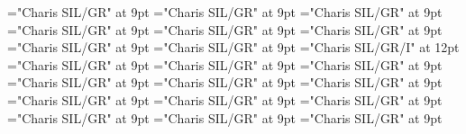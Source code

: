 \documentclass[gps1,twoside]{article}
\begin{document}
\font\complexformsnotsubentrycomplexformsnotsubentrycomplexformsnotsubentriesentrybefore="Charis SIL/GR" at 9pt
\font\complexformsnotsubentriesentryafter="Charis SIL/GR" at 9pt
\font\complexformtypescomplexformsnotsubentrycomplexformsnotsubentriesentryafter="Charis SIL/GR" at 9pt
\font\spanspanreverseabbrcomplexformtypecomplexformtypescomplexformsnotsubentrycomplexformsnotsubentriesentrybefore="Charis SIL/GR" at 9pt
\font\spanspanheadwordcomplexformsnotsubentrycomplexformsnotsubentriesentrybefore="Charis SIL/GR" at 9pt
\font\spanheadwordcomplexformsnotsubentrycomplexformsnotsubentriesentrylastchildafter="Charis SIL/GR" at 9pt
\font\morphosyntaxanalysismorphosyntaxanalysismorphosyntaxanalysescomplexformsnotsubentrycomplexformsnotsubentriesentrybefore="Charis SIL/GR" at 9pt
\font\morphosyntaxanalysescomplexformsnotsubentrycomplexformsnotsubentriesentryafter="Charis SIL/GR" at 9pt
\font\morphosyntaxanalysismorphosyntaxanalysescomplexformsnotsubentrycomplexformsnotsubentriesentry="Charis SIL/GR/I" at 12pt
\font\spanspanpartofspeechmorphosyntaxanalysismorphosyntaxanalysescomplexformsnotsubentrycomplexformsnotsubentriesentrybefore="Charis SIL/GR" at 9pt
\font\spanpartofspeechmorphosyntaxanalysismorphosyntaxanalysescomplexformsnotsubentrycomplexformsnotsubentriesentrylastchildafter="Charis SIL/GR" at 9pt
\font\spanspanslotsmorphosyntaxanalysismorphosyntaxanalysescomplexformsnotsubentrycomplexformsnotsubentriesentrybefore="Charis SIL/GR" at 9pt
\font\slotsmorphosyntaxanalysismorphosyntaxanalysescomplexformsnotsubentrycomplexformsnotsubentriesentrybefore="Charis SIL/GR" at 9pt
\font\spanspannameslotslotsmorphosyntaxanalysismorphosyntaxanalysescomplexformsnotsubentrycomplexformsnotsubentriesentrybefore="Charis SIL/GR" at 9pt
\font\spannameslotslotsmorphosyntaxanalysismorphosyntaxanalysescomplexformsnotsubentrycomplexformsnotsubentriesentrylastchildafter="Charis SIL/GR" at 9pt
\font\spanspanowningentrysummarydefinitioncomplexformsnotsubentrycomplexformsnotsubentriesentrybefore="Charis SIL/GR" at 9pt
\font\spanowningentrysummarydefinitioncomplexformsnotsubentrycomplexformsnotsubentriesentryfirstchildbefore="Charis SIL/GR" at 9pt
\font\spanowningentrysummarydefinitioncomplexformsnotsubentrycomplexformsnotsubentriesentrylastchildafter="Charis SIL/GR" at 9pt
\font\nontrivialentryrootnontrivialentryrootnontrivialentryrootscomplexformsnotsubentrycomplexformsnotsubentriesentrybefore="Charis SIL/GR" at 9pt
\font\nontrivialentryrootscomplexformsnotsubentrycomplexformsnotsubentriesentrybefore="Charis SIL/GR" at 9pt
\font\nontrivialentryrootscomplexformsnotsubentrycomplexformsnotsubentriesentryafter="Charis SIL/GR" at 9pt
\end{document}
